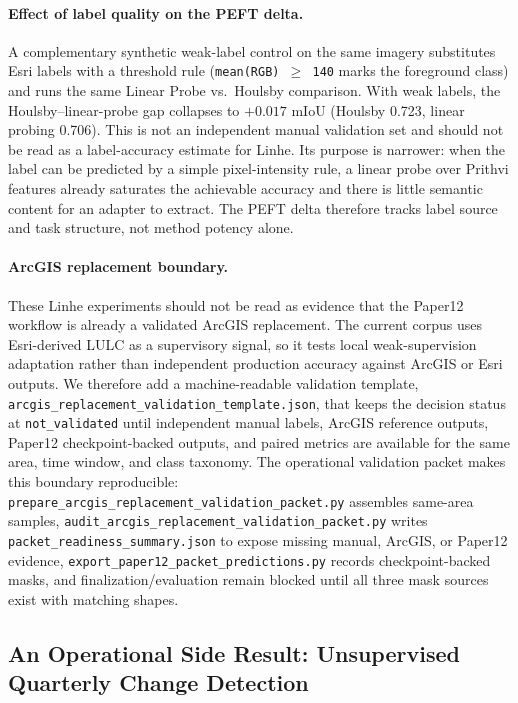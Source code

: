 \paragraph{Effect of label quality on the PEFT delta.}
A complementary synthetic weak-label control on the same imagery substitutes Esri labels with a threshold rule (\texttt{mean(RGB) $\geq$ 140} marks the foreground class) and runs the same Linear Probe vs.\ Houlsby comparison. With weak labels, the Houlsby--linear-probe gap collapses to $+0.017$ mIoU (Houlsby 0.723, linear probing 0.706). This is not an independent manual validation set and should not be read as a label-accuracy estimate for Linhe. Its purpose is narrower: when the label can be predicted by a simple pixel-intensity rule, a linear probe over Prithvi features already saturates the achievable accuracy and there is little semantic content for an adapter to extract. The PEFT delta therefore tracks label source and task structure, not method potency alone.
\paragraph{ArcGIS replacement boundary.}
These Linhe experiments should not be read as evidence that the Paper12 workflow is already a validated ArcGIS replacement. The current corpus uses Esri-derived LULC as a supervisory signal, so it tests local weak-supervision adaptation rather than independent production accuracy against ArcGIS or Esri outputs. We therefore add a machine-readable validation template, \texttt{arcgis\_replacement\_validation\_template.json}, that keeps the decision status at \texttt{not\_validated} until independent manual labels, ArcGIS reference outputs, Paper12 checkpoint-backed outputs, and paired metrics are available for the same area, time window, and class taxonomy. The operational validation packet makes this boundary reproducible: \texttt{prepare\_arcgis\_replacement\_validation\_packet.py} assembles same-area samples, \texttt{audit\_arcgis\_replacement\_validation\_packet.py} writes \texttt{packet\_readiness\_summary.json} to expose missing manual, ArcGIS, or Paper12 evidence, \texttt{export\_paper12\_packet\_predictions.py} records checkpoint-backed masks, and finalization/evaluation remain blocked until all three mask sources exist with matching shapes.

\subsection{An Operational Side Result: Unsupervised Quarterly Change Detection}

